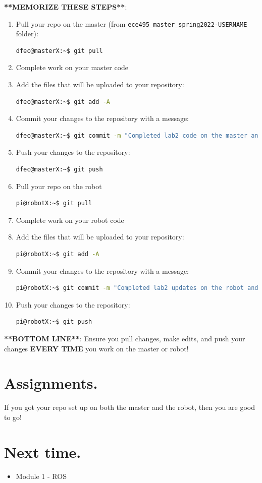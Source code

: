 \documentclass{handout}
\newcommand{\cmark}{\ding{51}}%
\newcommand{\done}{\rlap{$\square$}{\raisebox{2pt}{\large\hspace{1pt}\cmark}}%
	\hspace{-2.5pt}}
\begin{document}
\textbf{**MEMORIZE THESE STEPS**}:
\begin{enumerate}
	\item Pull your repo on the master (from \texttt{ece495\_master\_spring2022-USERNAME} folder):
\begin{lstlisting}[language=bash]
dfec@masterX:~$ git pull
\end{lstlisting}
	\item Complete work on your master code
	\item Add the files that will be uploaded to your repository:
\begin{lstlisting}[language=bash]
dfec@masterX:~$ git add -A
\end{lstlisting}
	\item Commit your changes to the repository with a message:
\begin{lstlisting}[language=bash]
dfec@masterX:~$ git commit -m "Completed lab2 code on the master and it works great!"
\end{lstlisting}
	\item Push your changes to the repository:
\begin{lstlisting}[language=bash]
dfec@masterX:~$ git push
\end{lstlisting}
	\item Pull your repo on the robot
\begin{lstlisting}[language=bash]
pi@robotX:~$ git pull
\end{lstlisting}
	\item Complete work on your robot code
\item Add the files that will be uploaded to your repository:
\begin{lstlisting}[language=bash]
pi@robotX:~$ git add -A
\end{lstlisting}
\item Commit your changes to the repository with a message:
\begin{lstlisting}[language=bash]
pi@robotX:~$ git commit -m "Completed lab2 updates on the robot and it works great!"
\end{lstlisting}
\item Push your changes to the repository:
\begin{lstlisting}[language=bash]
pi@robotX:~$ git push
\end{lstlisting}
\end{enumerate}

\textbf{**BOTTOM LINE**}: Ensure you pull changes, make edits, and push your changes \textbf{EVERY TIME} you work on the master or robot!


\section{Assignments.}
\begin{todolist}
	\item[\done] If you got your repo set up on both the master and the robot, then you are good to go!
\end{todolist}

\section{Next time.}
	\begin{itemize}
		\item Module 1 - ROS
	\end{itemize}
\end{document}
